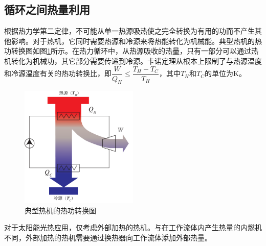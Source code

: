 \subsection{循环之间热量利用}
\label{sec:HRBC}

根据热力学第二定律，不可能从单一热源吸热使之完全转换为有用的功而不产生其他影响。对于热机，它同时需要热源和冷源来将热能转化为机械能。典型热机的热功转换图如图\ref{fig:engines}所示。在热力循环中，从热源吸收的热量，只有一部分可以通过热机转化为机械功，其它部分需要传递到冷源。卡诺定理从根本上限制了与热源温度和冷源温度有关的热功转换比，即$\dfrac{W}{Q_H} \leqslant \dfrac{T_H - T_C}{T_H}$，其中$T_H$和$T_C$的单位为$\mathrm{K}$。

\begin{figure}[ht]
\centering 
\includegraphics[width=0.5\textwidth]{fig/engines}
\caption{典型热机的热功转换图}\label{fig:engines}
\end{figure}

对于太阳能光热应用，仅考虑外部加热的热机。与在工作流体内产生热量的内燃机不同，外部加热的热机需要通过换热器向工作流体添加外部热量。

